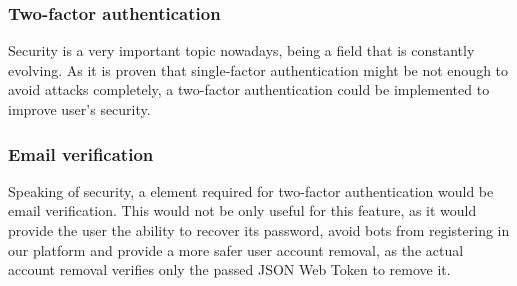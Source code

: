 \subsubsection{Two-factor authentication}

Security is a very important topic nowadays, being a field that is constantly evolving. As it is proven
that single-factor authentication might be not enough to avoid attacks completely, a two-factor authentication
could be implemented to improve user's security.

\subsubsection{Email verification}

Speaking of security, a element required for two-factor authentication would be email verification. This would not be 
only useful for this feature, as it would provide the user the ability to recover its password, avoid bots from registering
in our platform and provide a more safer user account removal, as the actual account removal verifies only the passed
JSON Web Token to remove it. 


